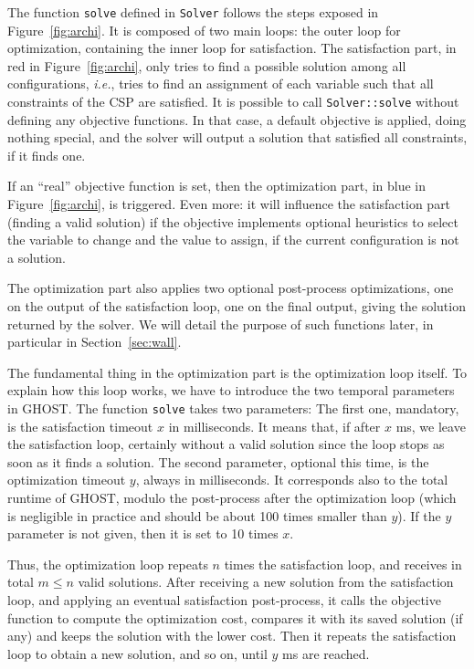 \documentclass{article}
\newcommand{\csp}{\textsc{CSP}\xspace}
\newcommand{\ghost}{\textsc{GHOST}\xspace}
\newcommand{\ie}{\textit{i.e.}}
\begin{document}
The  function \texttt{solve}  defined in  \texttt{Solver} follows  the
steps exposed  in Figure~\ref{fig:archi}. It  is composed of  two main
loops: the outer loop for  optimization, containing the inner loop for
satisfaction.      The     satisfaction     part,    in     red     in
Figure~\ref{fig:archi}, only  tries to find a  possible solution among
all configurations, \ie, tries to  find an assignment of each variable
such that all constraints of the \csp are satisfied. It is possible to
call \texttt{Solver::solve} without  defining any objective functions.
In that case,  a default objective is applied,  doing nothing special,
and the solver will output  a solution that satisfied all constraints,
if it finds one.

If an ``real'' objective function  is set, then the optimization part,
in blue  in Figure~\ref{fig:archi}, is  triggered. Even more:  it will
influence  the satisfaction  part (finding  a valid  solution) if  the
objective  implements optional  heuristics to  select the  variable to
change and the value to assign,  if the current configuration is not a
solution.

The  optimization   part  also   applies  two   optional  post-process
optimizations, one on the output of  the satisfaction loop, one on the
final output,  giving the  solution returned by  the solver.   We will
detail  the  purpose  of  such   functions  later,  in  particular  in
Section~\ref{sec:wall}.

The fundamental  thing in  the optimization  part is  the optimization
loop itself. To explain how this  loop works, we have to introduce the
two temporal  parameters in \ghost. The  function \texttt{solve} takes
two parameters: The first one,  mandatory, is the satisfaction timeout
$x$ in  milliseconds.  It means  that, if after  $x$ ms, we  leave the
satisfaction loop, certainly  without a valid solution  since the loop
stops as soon  as it finds a solution. The  second parameter, optional
this time, is the optimization timeout $y$, always in milliseconds. It
corresponds  also  to   the  total  runtime  of   \ghost,  modulo  the
post-process  after  the optimization  loop  (which  is negligible  in
practice and should  be about 100 times smaller than  $y$). If the $y$
parameter is not given, then it is set to 10 times $x$.

Thus, the optimization  loop repeats $n$ times  the satisfaction loop,
and receives  in total $m \leq  n$ valid solutions. After  receiving a
new  solution from  the satisfaction  loop, and  applying an  eventual
satisfaction post-process, it calls  the objective function to compute
the optimization  cost, compares it  with its saved solution  (if any)
and  keeps the  solution with  the lower  cost.  Then  it repeats  the
satisfaction loop  to obtain a new  solution, and so on,  until $y$ ms
are reached.
\end{document}
